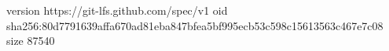 version https://git-lfs.github.com/spec/v1
oid sha256:80d7791639affa670ad81eba847bfea5bf995ecb53c598c15613563c467e7c08
size 87540
